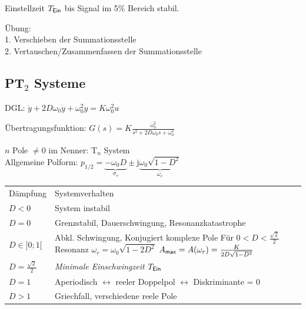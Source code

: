 \documentclass[fs, footer]{latex4ei}
\renewcommand{\i}{\mathrm{j}}
\begin{document}
\begin{multicols*}{4}
{	Einstellzeit $T_{\sf Ein}$ bis Signal im 5\% Bereich stabil.






Übung:\\
1. Verschieben der Summationsstelle\\
2. Vertauschen/Zusammenfassen der Summationsstelle\\

\subsection{PT$_2$ Systeme}
DGL: $\ddot y + 2D \omega_0 \dot y + \omega_0^2 y = K \omega_0^2 u$

Übertragungsfunktion: $G(s) = K \frac{\omega_0^2}{s^2 + 2 D \omega_0 s + \omega_0^2}$

$n$ Pole $\ne 0$ im Nenner: T$_n$ System\\
Allgemeine Polform: $p_{1/2} = \underbrace{-\omega_0 D}_{\sigma_e} \pm \i \underbrace{\omega_0 \sqrt{1 - D^2}}_{\omega_e}$\\ 

\begin{tabular}{@{}p{1cm}l}
Dämpfung & Systemverhalten\\ \mrule
$D < 0$ & System instabil\\
$D = 0$ & Grenzstabil, Dauerschwingung, Resonanzkatastrophe\\[0.5em]
\parbox{1cm}{$D \in ]0;1[$ \vspace{0.7cm}} & \parbox{5cm}{Abkl. Schwingung, Konjugiert komplexe Pole\\
	Für $0 < D < \frac{\sqrt{2}}{2}$ Resonanz $\omega_r = \omega_0 \sqrt{1-2D^2}$\\
	$A_{\sf max} = A(\omega_r) = \frac{K}{2D\sqrt{1-D^2}}$ }\\
$D = \frac{\sqrt{2}}{2}$ & \emph{Minimale Einschwingzeit $T_{\sf Ein}$}\\
$D = 1$ & Aperiodisch $\leftrightarrow$ reeler Doppelpol $\leftrightarrow$ Diskriminante = 0\\
$D > 1$ & Griechfall, verschiedene reele Pole\\
\end{tabular}
}





\end{multicols*}
\end{document}
